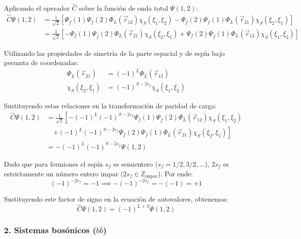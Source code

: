 Aplicando el operador $\hat{C}$ sobre la función de onda total $\Psi(1,2)$:
\begin{align}
    \hat{C} \Psi(1,2) &= \frac{1}{\sqrt{2}} \left[ \Psi_{\bar{f}}(1) \Psi_f(2) \Phi_L(\vec{r}_{12}) \chi_S(\xi_1, \xi_2) - \Psi_{\bar{f}}(2) \Psi_f(1) \Phi_L(\vec{r}_{21}) \chi_S(\xi_2, \xi_1) \right] \nonumber \\
    &= \frac{1}{\sqrt{2}} \left[ -\Psi_f(1) \Psi_{\bar{f}}(2) \Phi_L(\vec{r}_{21}) \chi_S(\xi_2, \xi_1) + \Psi_f(2) \Psi_{\bar{f}}(1) \Phi_L(\vec{r}_{12}) \chi_S(\xi_1, \xi_2) \right]
\end{align}

Utilizando las propiedades de simetría de la parte espacial y de espín bajo permuta de coordenadas:
\begin{align}
    \Phi_L(\vec{r}_{21}) &= (-1)^L \Phi_L(\vec{r}_{12}) \\
    \chi_S(\xi_2, \xi_1) &= (-1)^{S - 2s_f} \chi_S(\xi_1, \xi_2)
\end{align}

Sustituyendo estas relaciones en la transformación de paridad de carga:
\begin{align}
    \hat{C} \Psi(1,2) &= \frac{1}{\sqrt{2}} \left[ -(-1)^L (-1)^{S-2s_f} \Psi_f(1) \Psi_{\bar{f}}(2) \Phi_L(\vec{r}_{12}) \chi_S(\xi_1, \xi_2) \right. \nonumber \\
    &\quad \left. + (-1)^L (-1)^{S-2s_f} \Psi_f(2) \Psi_{\bar{f}}(1) \Phi_L(\vec{r}_{21}) \chi_S(\xi_2, \xi_1) \right] \nonumber \\
    &= -(-1)^L (-1)^{S - 2s_f} \Psi(1,2)
\end{align}

Dado que para fermiones el espín $s_f$ es semientero ($s_f = 1/2, 3/2, \dots$), $2s_f$ es estrictamente un número entero impar ($2s_f \in \mathbb{Z}_{\text{impar}}$). Por ende:
\begin{equation}
    (-1)^{-2s_f} = -1 \implies -(-1)^{-2s_f} = -(-1) = +1
\end{equation}

Sustituyendo este factor de signo en la ecuación de autovalores, obtenemos:
\begin{equation}
    \hat{C} \Psi(1,2) = (-1)^{L+S} \Psi(1,2)
\end{equation}

\subsubsection*{2. Sistemas bosónicos ($b\bar{b}$)}

